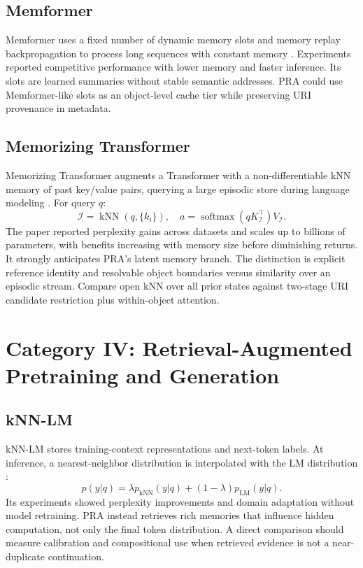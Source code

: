 \documentclass[10pt,a4paper]{article}
\begin{document}
\subsection{Memformer}
Memformer uses a fixed number of dynamic memory slots and memory replay backpropagation to process long sequences with constant memory \citep{wu2020memformer}. Experiments reported competitive performance with lower memory and faster inference. Its slots are learned summaries without stable semantic addresses. PRA could use Memformer-like slots as an object-level cache tier while preserving URI provenance in metadata.

\subsection{Memorizing Transformer}
Memorizing Transformer augments a Transformer with a non-differentiable kNN memory of past key/value pairs, querying a large episodic store during language modeling \citep{wu2022memorizing}. For query $q$:
\begin{equation}
\mathcal{I}=\operatorname{kNN}(q,\{k_i\}),\quad a=\operatorname{softmax}(qK_{\mathcal I}^\top)V_{\mathcal I}.
\end{equation}
The paper reported perplexity gains across datasets and scales up to billions of parameters, with benefits increasing with memory size before diminishing returns. It strongly anticipates PRA's latent memory branch. The distinction is explicit reference identity and resolvable object boundaries versus similarity over an episodic stream. Compare open kNN over all prior states against two-stage URI candidate restriction plus within-object attention.

\section{Category IV: Retrieval-Augmented Pretraining and Generation}
\subsection{kNN-LM}
kNN-LM stores training-context representations and next-token labels. At inference, a nearest-neighbor distribution is interpolated with the LM distribution \citep{khandelwal2020knnlm}:
\begin{equation}
p(y|q)=\lambda p_{\mathrm{kNN}}(y|q)+(1-\lambda)p_{\mathrm{LM}}(y|q).
\end{equation}
Its experiments showed perplexity improvements and domain adaptation without model retraining. PRA instead retrieves rich memories that influence hidden computation, not only the final token distribution. A direct comparison should measure calibration and compositional use when retrieved evidence is not a near-duplicate continuation.
\end{document}
